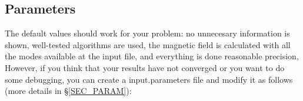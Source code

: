 
\subsection{Parameters}

The default values should work for your problem: no unnecesary information is shown, well-tested algorithms are used, the magnetic field is calculated with all the modes available at the input file, and everything is done reasonable precision, However, if you think that your results have not converged or you want to do some debugging, you can create a {\ttfamily input.parameters} file and modify it as follows (more details in \S\ref{SEC_PARAM}):


\renewcommand{\arraystretch}{2}
